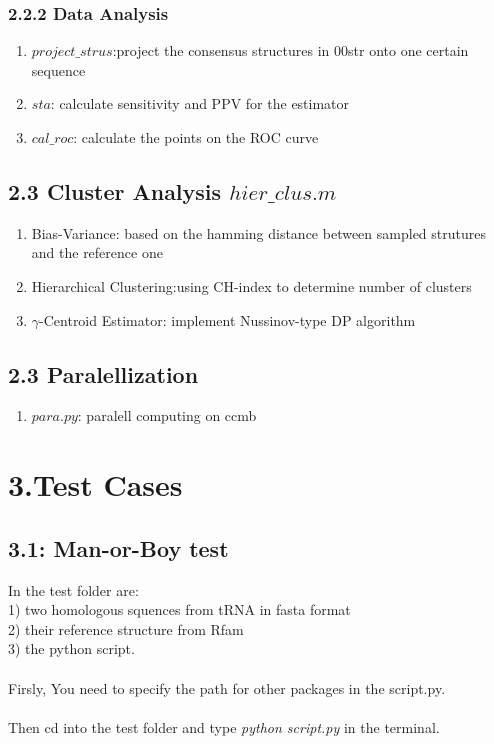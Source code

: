 \documentclass{article}
\begin{document}
\begin{spacing}{1.1}
\subsubsection{2.2.2 Data Analysis}
\begin{enumerate}
\item $project\_strus$:project the consensus structures in 00str onto one certain sequence 
\item $sta$: calculate sensitivity and PPV for the estimator
\item $cal\_roc$: calculate the points on the ROC curve
\end{enumerate}
\subsection{2.3 {\bf Cluster Analysis} $hier\_clus.m$}
\begin{enumerate}
\item Bias-Variance: based on the hamming distance between sampled strutures and the reference one
\item Hierarchical Clustering:using CH-index to determine number of clusters
\item $\gamma$-Centroid Estimator: implement Nussinov-type DP algorithm
\end{enumerate}

\subsection{2.3 Paralellization}
\begin{enumerate}
\item $para.py$: paralell computing on ccmb
\end{enumerate}


\section{3.Test Cases}
\subsection{3.1: Man-or-Boy test}
In the test folder are:\\
1) two homologous squences from tRNA in fasta format\\
2) their reference structure from Rfam\\
3) the python script.\\ \\
Firsly, You need to specify the path for other packages in the script.py. \\ \\
Then cd into the test folder and type \emph{python script.py} in the terminal.

\end{spacing}
\end{document}
